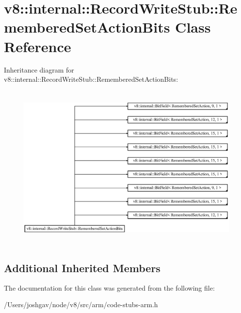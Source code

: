 \hypertarget{classv8_1_1internal_1_1_record_write_stub_1_1_remembered_set_action_bits}{}\section{v8\+:\+:internal\+:\+:Record\+Write\+Stub\+:\+:Remembered\+Set\+Action\+Bits Class Reference}
\label{classv8_1_1internal_1_1_record_write_stub_1_1_remembered_set_action_bits}
Inheritance diagram for v8\+:\+:internal\+:\+:Record\+Write\+Stub\+:\+:Remembered\+Set\+Action\+Bits\+:\begin{figure}[H]
\begin{center}
\leavevmode
\includegraphics[height=8.333334cm]{classv8_1_1internal_1_1_record_write_stub_1_1_remembered_set_action_bits}
\end{center}
\end{figure}
\subsection*{Additional Inherited Members}


The documentation for this class was generated from the following file\+:\begin{DoxyCompactItemize}
\item 
/\+Users/joshgav/node/v8/src/arm/code-\/stubs-\/arm.\+h\end{DoxyCompactItemize}
